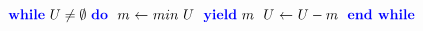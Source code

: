\documentclass[a4paper,12pt]{article}
\begin{document}
\noindent
 $  \ \textbf{\textcolor{blue}{while}} \   U \neq \emptyset  \  \textbf{\textcolor{blue}{do}} \   \ \textcolor{black}{m} \  \textcolor{black}{\leftarrow} \  \textcolor{black}{min} \  \textcolor{black}{U} \   \ \textbf{\textcolor{blue}{yield}} \  \textcolor{black}{m} \   \ \textcolor{black}{U} \  \textcolor{black}{\leftarrow} \   U - m  \   \ \textbf{\textcolor{blue}{end while}} \   \ $ 
\end{document}

